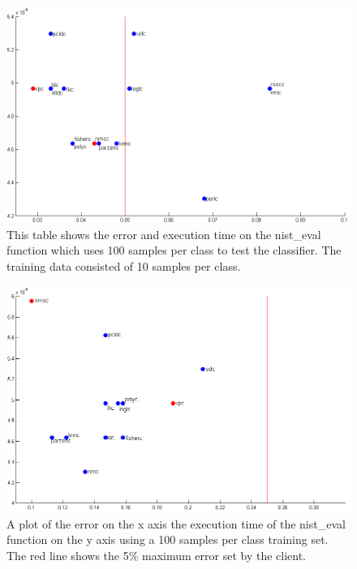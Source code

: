 \documentclass[%
        compressed,
        final,
        notitlepage,
        narroweqnarray,
        inline,
        twoside,
        ]{ieee}
\begin{document}
\begin{figure}[H]
    \includegraphics[width=\columnwidth]{images/large_data_set_tested.png}

    \caption{ This table shows the error and execution time on the nist\_eval
    function which uses 100 samples per class to test the classifier. The
training data consisted of 10 samples per class. }
    \label{fig:test-large}
\end{figure}
    
\begin{figure}[H]
    \includegraphics[width=\columnwidth]{images/small_data_set_tested.png}

    \caption{
        A plot of the error on the x axis the execution time of the nist\_eval
        function on the y axis using a 100 samples per class training set. The
        red line shows the 5\% maximum error set by the client.  }
    \label{fig:test-small}
\end{figure}
\end{document}
